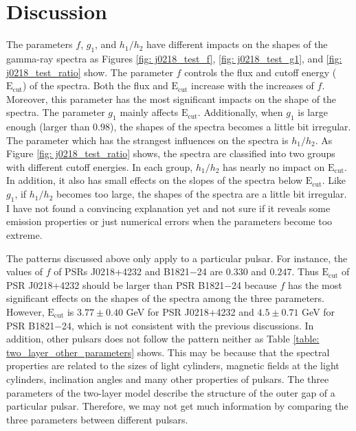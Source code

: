 \documentclass[a4paper, 12pt]{report}
\begin{document}
\chapter{Discussion}
  The parameters $f$, $g_1$, and $h_1/h_2$ have different impacts on the shapes of 
  the gamma-ray spectra as Figures \ref{fig: j0218_test_f}, \ref{fig: j0218_test_g1}, and 
  \ref{fig: j0218_test_ratio} show. The parameter $f$ controls the flux and cutoff energy
  ($\text{E}_{\text{cut}}$) of the spectra. Both the flux and $\text{E}_{\text{cut}}$ increase 
  with the increases of $f$. Moreover, this parameter has the most significant impacts on 
  the shape of the spectra. 
  The parameter $g_1$ mainly affects $\text{E}_{\text{cut}}$.
  Additionally, when $g_1$ is large enough (larger than $0.98$), the shapes of the spectra 
  becomes a little bit irregular. 
  The parameter which has the strangest influences on the spectra is $h_1/h_2$. As Figure
  \ref{fig: j0218_test_ratio} shows, the spectra are classified into two groups with 
  different cutoff energies. In each group, $h_1/h_2$ has nearly no impact on 
  $\text{E}_{\text{cut}}$. In addition, it also has small effects on the slopes of the 
  spectra below $\text{E}_{\text{cut}}$. 
  Like $g_1$, if $h_1/h_2$ becomes too large, the shapes of the spectra are a little 
  bit irregular. I have not found a convincing explanation yet and not sure if it reveals 
  some emission properties or just numerical errors when the parameters become too extreme. 

  The patterns discussed above only apply to a particular pulsar. For instance, 
  the values of $f$ of PSRs J0218+4232 and B1821$-$24 are $0.330$ and $0.247$.
  Thus $\text{E}_{\text{cut}}$ of PSR J0218+4232 should be larger than PSR B1821$-$24 because 
  $f$ has the most significant effects on the shapes of the spectra among the three parameters.  
  However, $\text{E}_{\text{cut}}$ is $3.77\pm0.40$ GeV for PSR J0218+4232 and 
  $4.5\pm0.71$ GeV for PSR B1821$-$24, which is not consistent with the 
  previous discussions. In addition, other pulsars does not follow the pattern neither as 
  Table \ref{table: two_layer_other_parameters} shows. This may be because that the spectral 
  properties are related to the sizes of light cylinders, magnetic fields at the light 
  cylinders, inclination angles and many other properties of pulsars. The three parameters 
  of the two-layer model describe the structure of the outer gap of a particular pulsar. 
  Therefore, we may not get much information by comparing the three parameters between 
  different pulsars. 
\end{document}
